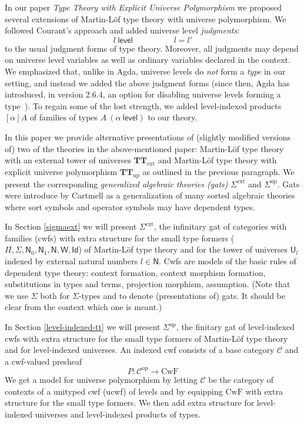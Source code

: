 \documentclass[11pt,a4paper]{article}
\theoremstyle{plain}
\theoremstyle{definition}
\newcommand{\Id}{\mathsf{Id}}
\newcommand{\NN}{\mathsf{N}}
\newcommand{\level}{\mathsf{level}}
\newcommand{\op}{\mathrm{op}}
\def\NN{\mathsf{N}}
\newcommand{\N}{\mathsf{N}}
\def\U{\mathsf{U}}
\def\CwF{\mathrm{CwF}}
\def\C{\mathcal{C}}
\def\W{\mathsf{W}}
\def\Sigmaext{{\Sigma^\mathrm{ext}}}
\def\Sigmaint{{\Sigma^\mathrm{up}}}
\def\TText{{\mathbf{TT}_\mathrm{ext}}}
\def\TTint{{\mathbf{TT}_\mathrm{up}}}
\begin{document}
In our paper {\em Type Theory with Explicit Universe Polymorphism} \cite{BezemCDE22} we proposed several extensions of Martin-Löf type theory with universe polymorphism. We followed Courant's approach \cite{Courant02} and added universe level {\em judgments}:
$$
l\ \level
\hspace{5em}
l = l'
$$
to the usual judgment forms of type theory. Moreover, all judgments may depend on universe level variables as well as ordinary variables declared in the context. We emphasized that, unlike in Agda, universe levels do {\em not} form a {\em type} in our setting, and instead we added the above judgment forms (since then, Agda has introduced, in version 2.6.4, an option for disabling universe levels forming a type~\cite{agda:leveluniv}).  To regain some of the lost strength, we added level-indexed products $[\alpha]A$ of families of types $A\ (\alpha\ \level)$ to our theory.

In this paper we provide alternative presentations of (slightly modified versions of) two of the theories in the above-mentioned paper: Martin-Löf type theory with an external tower of universes $\TText$ and Martin-Löf type theory with explicit universe polymorphism $\TTint$ as outlined in the previous paragraph. We present the corresponding {\em generalized algebraic theories (gats)} $\Sigmaext$ and $\Sigmaint$. Gats were introduce by Cartmell \cite{cartmell:phd,cartmell:apal} as a generalization of many sorted algebraic theories where sort symbols and operator symbols may have dependent types. 

In Section \ref{sigmaext} we will present $\Sigmaext$, the infinitary gat of categories with families (cwfs)  \cite{dybjer:torino} with extra structure for the small type formers ($\Pi, \Sigma, \N_0, \N_1, \N, \W, \Id$) of Martin-Löf type theory and for the tower of universes $\U_l$ indexed by external natural numbers $l \in \NN$. Cwfs are models of the basic rules of dependent type theory: context formation, context morphism formation, substitutions in types and terms, projection morphism, assumption.  (Note that we use $\Sigma$ both for $\Sigma$-types and to denote (presentations of) gats. It should be clear from the context which one is meant.)

In Section \ref{level-indexed-tt} we will present $\Sigmaint$, the finitary gat of level-indexed cwfs with extra structure for the small type formers of Martin-Löf type theory and for level-indexed universes. An indexed cwf consists of a base category $\C$ and a cwf-valued presheaf
$$
P : \C^\op \to \CwF
$$
We get a model for universe polymorphism by letting $\C$ be the category of contexts of a unityped cwf (ucwf) of levels and by equipping $\CwF$ with extra structure for the small type formers. We then add extra structure for level-indexed universes and level-indexed products of types.
\end{document}
